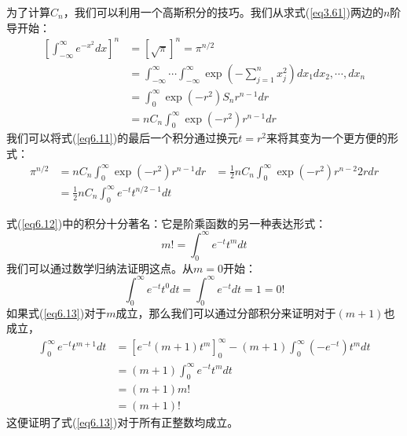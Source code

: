 \documentclass[UTF8]{ctexart}
\numberwithin{equation}{section}%
\numberwithin{figure}{section}%
\begin{document}
    为了计算$C_n$，我们可以利用一个高斯积分的技巧。我们从求式(\ref{eq3.61})两边的$n$阶导开始：
    \begin{equation}\label{eq6.11}
        \begin{aligned}
        {\left[\int_{-\infty}^{\infty} e^{-x^{2}} d x\right]^{n} } &=[\sqrt{\pi}]^{n}=\pi^{n / 2} \\
        &=\int_{-\infty}^{\infty} \cdots \int_{-\infty}^{\infty} \exp \left(-\sum_{j=1}^{n} x_{j}^{2}\right) d x_{1} d x_{2}, \cdots, d x_{n} \\
        &=\int_{0}^{\infty} \exp \left(-r^{2}\right) S_{n} r^{n-1} d r \\
        &=n C_{n} \int_{0}^{\infty} \exp \left(-r^{2}\right) r^{n-1} d r
        \end{aligned}
        \end{equation}
    我们可以将式(\ref{eq6.11})的最后一个积分通过换元$t=r^2$来将其变为一个更方便的形式：
        \begin{equation}\label{eq6.12}
            \begin{aligned}
                \pi^{n / 2}&=n C_{n} \int_{0}^{\infty} \exp \left(-r^{2}\right) r^{n-1} d r
            &=\frac{1}{2} n C_{n} \int_{0}^{\infty} \exp \left(-r^{2}\right) r^{n-2} 2 r d r \\
            &=\frac{1}{2} n C_{n} \int_{0}^{\infty} e^{-t} t^{n / 2-1} d t
            \end{aligned}
            \end{equation}
    
    式(\ref{eq6.12})中的积分十分著名：它是阶乘函数的另一种表达形式：
    \begin{equation}\label{eq6.13}
        m !=\int_{0}^{\infty} e^{-t} t^{m} d t
        \end{equation}
    我们可以通过数学归纳法证明这点。从$m=0$开始：
    \begin{equation}
        \int_{0}^{\infty} e^{-t} t^{0} d t=\int_{0}^{\infty} e^{-t} d t=1=0 !
        \end{equation}
    如果式(\ref{eq6.13})对于$m$成立，那么我们可以通过分部积分来证明对于$(m+1)$也成立，
    \begin{equation}
        \begin{aligned}
        \int_{0}^{\infty} e^{-t} t^{m+1} d t &=\left[e^{-t}(m+1) t^{m}\right]_{0}^{\infty}-(m+1) \int_{0}^{\infty}\left(-e^{-t}\right) t^{m} d t \\
        &=(m+1) \int_{0}^{\infty} e^{-t} t^{m} d t \\
        &=(m+1) m ! \\
        &=(m+1) !
        \end{aligned}
        \end{equation}
    这便证明了式(\ref{eq6.13})对于所有正整数均成立。
\end{document}
